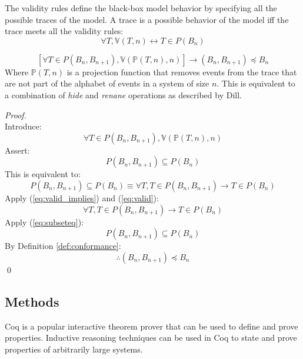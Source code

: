 \documentclass[runningheads]{llncs}
\newcommand{\actsvalid}[2]{\mathds{V}(#1, #2)}
\newcommand{\projectsize}[2]{\mathds{P}(#1, #2)}
\begin{document}
The validity rules define the black-box model behavior by specifying all the possible traces of the model. A trace is a possible behavior of the model iff the trace meets all the validity rules:
\begin{equation}
\label{eq:valid_implies}
\forall T, \actsvalid{T}{n} \leftrightarrow
 T \in P(B_n)
\end{equation}

\begin{theorem}
\label{thm:valid_imp_conf}
$$
\left[ \forall T \in P(B_n, B_{n+1}), \actsvalid{\projectsize{T}{n}}{n} \right] \longrightarrow (B_n, B_{n+1}) \preceq B_n
$$
Where $\projectsize{T}{n}$ is a projection function that removes events from the trace that are not part of the alphabet of events in a system of size $n$. This is equivalent to a combination of \emph{hide} and \emph{renane} operations as described by Dill. 
\begin{proof}\ \\
Introduce: 
\begin{equation}
\label{eq:valid}
\forall T \in P(B_n, B_{n+1}), \actsvalid{\projectsize{T}{n}}{n}
\end{equation}
Assert:
\begin{equation}
P(B_n, B_{n+1}) \subseteq P(B_n)
\end{equation}
This is equivalent to:
\begin{equation}
\label{eq:subseteq}
P(B_n, B_{n+1}) \subseteq P(B_n) \equiv \forall T, T \in P(B_n, B_{n+1}) \longrightarrow T \in P(B_n)
\end{equation}
Apply (\ref{eq:valid_implies}) and (\ref{eq:valid}):
\begin{equation}
\forall T, T \in P(B_n, B_{n+1}) \longrightarrow T \in P(B_n)
\end{equation}
Apply (\ref{eq:subseteq}):
\begin{equation}
    \label{eq:goal2}
    P(B_n, B_{n+1}) \subseteq P(B_n)
\end{equation}
By Definition \ref{def:conformance}:
\begin{equation}
\therefore (B_n, B_{n+1}) \preceq B_n
\end{equation}
\qed
\end{proof}
\end{theorem}

\subsection{Methods}
Coq is a popular interactive theorem prover that can be used to define and prove properties. Inductive reasoning techniques can be used in Coq to state and prove properties of arbitrarily large systems. 
\end{document}
